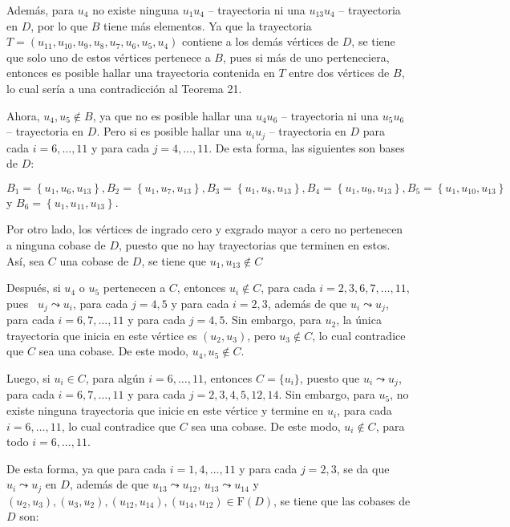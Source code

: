 \documentclass[12pt, fleqn]{article}
\newcommand{\F}[1]{\mathrm{F} \! \left( #1 \right)}
\newcommand{\tray}[2]{$ #1 #2 $ -- trayectoria}
\begin{document}
\begin{enumerate}
		Además, para $ u_4 $ no existe ninguna \tray{u_1}{u_4} ni una \tray{u_{13}}{u_4} en $D$, por lo que $ B $ tiene más elementos. Ya que la trayectoria $ T = (u_{11}, u_{10}, u_9, u_8, u_7, u_6, u_5, u_4) $ contiene a los demás vértices de $D$, se tiene que solo uno de estos vértices pertenece a $ B $, pues si más de uno perteneciera, entonces es posible hallar una trayectoria contenida en $T$ entre dos vértices de $ B $, lo cual sería a una contradicción al Teorema 21. 

		Ahora, $ u_4, u_5 \notin B $, ya que no es posible hallar una \tray{u_4}{u_6} ni una \tray{u_5}{u_6} en $D$. Pero si es posible hallar una \tray{u_i}{u_j} en $D$ para cada $ i = 6, \ldots, 11 $ y para cada $ j = 4, \ldots, 11 $. De esta forma, las siguientes son bases de $D$: 

		$ B_1 = \left\lbrace u_1, u_{6}, u_{13} \right\rbrace, B_2 = \left\lbrace u_1, u_{7}, u_{13} \right\rbrace, B_3 = \left\lbrace u_1, u_{8}, u_{13} \right\rbrace, B_4 = \left\lbrace u_1, u_{9}, u_{13} \right\rbrace, B_5 = \left\lbrace u_1, u_{10}, u_{13} \right\rbrace$ y $ B_6 = \left\lbrace u_1, u_{11}, u_{13} \right\rbrace $.

		Por otro lado, los vértices de ingrado cero y exgrado mayor a cero no pertenecen a ninguna cobase de $D$, puesto que no hay trayectorias que terminen en estos. Así, sea $ C $ una cobase de $D$, se tiene que $ u_1, u_{13} \notin C $

        Después, si $ u_4 $ o $ u_5 $ pertenecen a $C$, entonces $ u_i \notin C $, para cada $ i = 2, 3, 6, 7, \ldots, 11 $, pues \, $ u_j \leadsto u_i $, para cada $ j = 4, 5 $ y para cada $ i = 2, 3 $, además de que $ u_i \leadsto u_j $, para cada $ i = 6, 7, \ldots, 11 $ y para cada $ j = 4, 5 $. Sin embargo, para $ u_2 $, la única trayectoria que inicia en este vértice es $ (u_2, u_3) $, pero $ u_3 \notin C $, lo cual contradice que $C$ sea una cobase. De este modo, $ u_4, u_5 \notin C $.

        Luego, si $ u_i \in C $, para algún $ i = 6, \ldots, 11 $, entonces $ C = \lbrace u_i \rbrace $, puesto que $ u_i \leadsto u_j $, para cada $ i = 6, 7, \ldots, 11 $ y para cada $ j = 2, 3, 4, 5, 12, 14 $. Sin embargo, para $ u_5 $, no existe ninguna trayectoria que inicie en este vértice y termine en $ u_i $, para cada $ i = 6, \ldots, 11 $, lo cual contradice que $C$ sea una cobase. De este modo, $ u_i \notin C $, para todo $ i = 6, \ldots, 11 $.

		De esta forma, ya que para cada $ i = 1, 4, \ldots, 11 $ y para cada $ j = 2, 3 $, se da que $ u_i \leadsto u_j $ en $D$, además de que $ u_{13} \leadsto u_{12} $, $ u_{13} \leadsto u_{14} $ y $ (u_2, u_3), (u_3, u_2), (u_{12}, u_{14}), (u_{14}, u_{12}) \in \F{D} $, se tiene que las cobases de $D$ son:


\end{enumerate}
\end{document}
